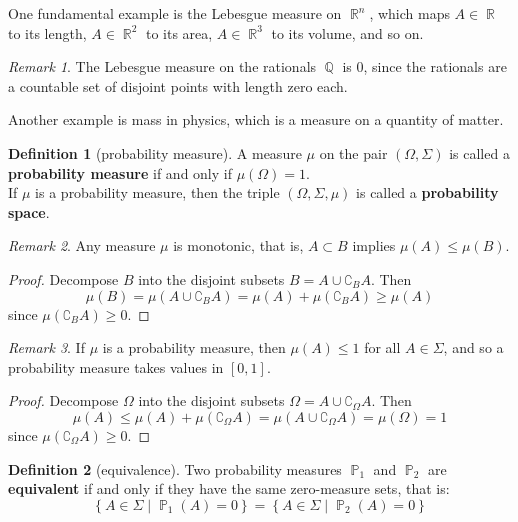 \documentclass[11pt]{article}
\theoremstyle{definition}
\newtheorem{definition}{Definition}[section]
\theoremstyle{remark}
\newtheorem{remark}{Remark}
\DeclareMathOperator{\Real}{\mathbb{R}}
\DeclareMathOperator{\Rational}{\mathbb{Q}}
\DeclareMathOperator{\Prob}{\mathbb{P}}
\begin{document}
One fundamental example is the Lebesgue measure on $\Real^n$, which maps $A \in \Real$ to its length, $A \in \Real^2$ to its area, $A \in \Real^3$ to its volume, and so on.
\begin{remark}
The Lebesgue measure on the rationals $\Rational$ is 0, since the rationals are a countable set of disjoint points with length zero each.
\end{remark}
Another example is mass in physics, which is a measure on a quantity of matter.

\begin{definition}[probability measure]
A measure $\mu$ on the pair $(\Omega, \Sigma)$ is called a {\bf probability measure} if and only if $\mu(\Omega) = 1$. \\
If $\mu$ is a probability measure, then the triple $(\Omega, \Sigma, \mu)$ is called a {\bf probability space}.
\end{definition}

\begin{remark}
Any measure $\mu$ is monotonic, that is, $A \subset B$ implies $\mu(A) \leq \mu(B)$.
\end{remark}

\begin{proof} Decompose $B$ into the disjoint subsets $B = A \cup \complement_B A$. Then
$$ \mu(B) = \mu(A \cup \complement_B A) = \mu(A) + \mu(\complement_B A) \geq\mu(A)$$
since $\mu(\complement_B A) \geq 0$.
\end{proof}

\begin{remark}
If $\mu$ is a probability measure, then $\mu(A) \leq 1$ for all $A \in \Sigma$, and so a probability measure takes values in $[0, 1]$.
\end{remark}

\begin{proof} Decompose $\Omega$ into the disjoint subsets $\Omega = A \cup \complement_\Omega A$. Then
$$\mu(A) \leq \mu(A) + \mu(\complement_\Omega A) = \mu(A \cup \complement_\Omega A) = \mu(\Omega) = 1$$
since $\mu(\complement_\Omega A) \geq 0$.
\end{proof}

\begin{definition}[equivalence] Two probability measures $\Prob_1$ and $\Prob_2$ are {\bf equivalent} if and only if they have the same zero-measure sets, that is:
$$ \left\{ A \in \Sigma \middle| \Prob_1(A) = 0 \right\} = \left\{ A \in \Sigma \middle| \Prob_2(A) = 0 \right\} $$
\end{definition}
\end{document}
